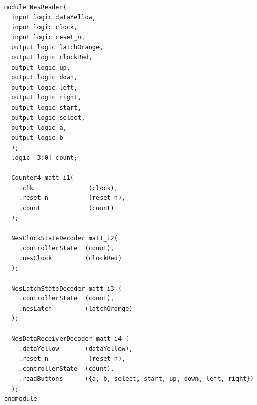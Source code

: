 \documentclass[a4paper]{article}
\begin{document}
\begin{Verbatim}[tabsize = 4]
module NesReader(
  input logic dataYellow,
  input logic clock,
  input logic reset_n,
  output logic latchOrange,
  output logic clockRed,
  output logic up,
  output logic down,
  output logic left,
  output logic right,
  output logic start,
  output logic select,
  output logic a,
  output logic b
  );
  logic [3:0] count;

  Counter4 matt_i1(
    .clk               (clock), 
    .reset_n           (reset_n), 
    .count             (count)
  );

  NesClockStateDecoder matt_i2(
    .controllerState  (count), 
    .nesClock         (clockRed)
  );

  NesLatchStateDecoder matt_i3 (
    .controllerState  (count), 
    .nesLatch         (latchOrange)
  );

  NesDataReceiverDecoder matt_i4 (
    .dataYellow       (dataYellow), 
    .reset_n           (reset_n),
    .controllerState  (count), 
    .readButtons      ({a, b, select, start, up, down, left, right})
  );
endmodule

\end{Verbatim}
\end{document}
